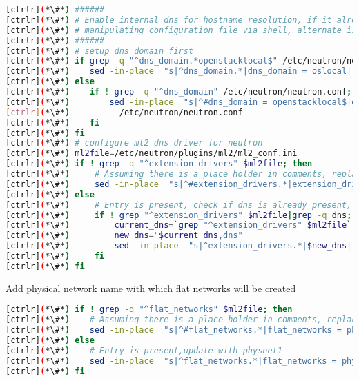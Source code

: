 
\begin{lstlisting}[language=bash,keywords={}]
[ctrlr](*\#*) ######
[ctrlr](*\#*) # Enable internal dns for hostname resolution, if it already not set
[ctrlr](*\#*) # manipulating configuration file via shell, alternate is to use openstack-config 
[ctrlr](*\#*) ######
[ctrlr](*\#*) # setup dns domain first
[ctrlr](*\#*) if grep -q "^dns_domain.*openstacklocal$" /etc/neutron/neutron.conf; then
[ctrlr](*\#*)    sed -in-place  "s|^dns_domain.*|dns_domain = oslocal|" /etc/neutron/neutron.conf
[ctrlr](*\#*) else
[ctrlr](*\#*)    if ! grep -q "^dns_domain" /etc/neutron/neutron.conf; then
[ctrlr](*\#*)        sed -in-place  "s|^#dns_domain = openstacklocal$|dns_domain = oslocal|" \
[ctrlr](*\#*)          /etc/neutron/neutron.conf
[ctrlr](*\#*)    fi
[ctrlr](*\#*) fi
[ctrlr](*\#*) # configure ml2 dns driver for neutron
[ctrlr](*\#*) ml2file=/etc/neutron/plugins/ml2/ml2_conf.ini
[ctrlr](*\#*) if ! grep -q "^extension_drivers" $ml2file; then
[ctrlr](*\#*)     # Assuming there is a place holder in comments, replace that string
[ctrlr](*\#*)     sed -in-place  "s|^#extension_drivers.*|extension_drivers = port_security,dns|" $ml2file
[ctrlr](*\#*) else
[ctrlr](*\#*)     # Entry is present, check if dns is already present, if not then enable
[ctrlr](*\#*)     if ! grep "^extension_drivers" $ml2file|grep -q dns; then
[ctrlr](*\#*)         current_dns=`grep "^extension_drivers" $ml2file`
[ctrlr](*\#*)         new_dns="$current_dns,dns"
[ctrlr](*\#*)         sed -in-place  "s|^extension_drivers.*|$new_dns|" $ml2file
[ctrlr](*\#*)     fi
[ctrlr](*\#*) fi
\end{lstlisting} 

	Add physical network name with which flat networks will be created


\begin{lstlisting}[language=bash,keywords={}]
[ctrlr](*\#*) if ! grep -q "^flat_networks" $ml2file; then
[ctrlr](*\#*)    # Assuming there is a place holder in comments, replace that string
[ctrlr](*\#*)    sed -in-place  "s|^#flat_networks.*|flat_networks = physnet1|" $ml2file
[ctrlr](*\#*) else
[ctrlr](*\#*)    # Entry is present,update with physnet1 
[ctrlr](*\#*)    sed -in-place  "s|^flat_networks.*|flat_networks = physnet1|" $ml2file
[ctrlr](*\#*) fi
\end{lstlisting} 

